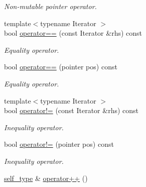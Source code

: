 \begin{DoxyCompactItemize}
\begin{DoxyCompactList}\small\item\em Non-\/mutable pointer operator. \end{DoxyCompactList}\item 
\hypertarget{class_d_o_1_1_axis_iterator_a74e10c48af258faf471b5ff616c6395a}{{\footnotesize template$<$typename Iterator $>$ }\\bool \hyperlink{class_d_o_1_1_axis_iterator_a74e10c48af258faf471b5ff616c6395a}{operator==} (const Iterator \&rhs) const }\label{class_d_o_1_1_axis_iterator_a74e10c48af258faf471b5ff616c6395a}

\begin{DoxyCompactList}\small\item\em Equality operator. \end{DoxyCompactList}\item 
\hypertarget{class_d_o_1_1_axis_iterator_ad3e7caef9082dd2b3f65ea3867336476}{bool \hyperlink{class_d_o_1_1_axis_iterator_ad3e7caef9082dd2b3f65ea3867336476}{operator==} (pointer pos) const }\label{class_d_o_1_1_axis_iterator_ad3e7caef9082dd2b3f65ea3867336476}

\begin{DoxyCompactList}\small\item\em Equality operator. \end{DoxyCompactList}\item 
\hypertarget{class_d_o_1_1_axis_iterator_a46311058c789c83df9d72020c4334da7}{{\footnotesize template$<$typename Iterator $>$ }\\bool \hyperlink{class_d_o_1_1_axis_iterator_a46311058c789c83df9d72020c4334da7}{operator!=} (const Iterator \&rhs) const }\label{class_d_o_1_1_axis_iterator_a46311058c789c83df9d72020c4334da7}

\begin{DoxyCompactList}\small\item\em Inequality operator. \end{DoxyCompactList}\item 
\hypertarget{class_d_o_1_1_axis_iterator_ac966afbaec9c16d1cc1bb6819810ab10}{bool \hyperlink{class_d_o_1_1_axis_iterator_ac966afbaec9c16d1cc1bb6819810ab10}{operator!=} (pointer pos) const }\label{class_d_o_1_1_axis_iterator_ac966afbaec9c16d1cc1bb6819810ab10}

\begin{DoxyCompactList}\small\item\em Inequality operator. \end{DoxyCompactList}\item 
\hypertarget{class_d_o_1_1_axis_iterator_a68c6d6abdde9fef27d6a4f2904212559}{\hyperlink{class_d_o_1_1_axis_iterator}{self\-\_\-type} \& \hyperlink{class_d_o_1_1_axis_iterator_a68c6d6abdde9fef27d6a4f2904212559}{operator++} ()}\label{class_d_o_1_1_axis_iterator_a68c6d6abdde9fef27d6a4f2904212559}


\end{DoxyCompactItemize}
